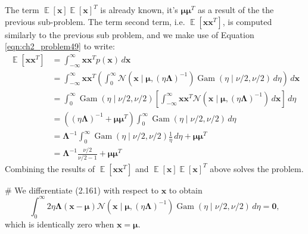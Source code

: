 \documentclass[12pt, a4paper]{article}
\newcommand{\vect}[1]{\bm{#1}}
\DeclareMathOperator{\E}{\mathbb{E}}
\begin{document}
\begin{easylist}[enumerate]
	The term $\E \left[ \vect{x}  \right] \E \left[ \vect{x}  \right]^T$ is already known, it's $\vect{\mu} \vect{\mu}^T$ as a result of the the previous sub-problem.
	The term second term, i.e. $\E \left[ \vect{x} \vect{x}^T \right]$, is computed similarly to the previous sub problem, and we make use of Equation \eqref{eqn:ch2_problem49} to write:
	\begin{align*}
	\E[ \vect{x} \vect{x}^T ] &= \int_{-\infty}^{\infty} \vect{x} \vect{x}^T  p(\vect{x} ) \, d\vect{x}  \\
	&= \int_{-\infty}^{\infty} \vect{x} \vect{x}^T 
	\left( 
	\int_{0}^{\infty}
	\mathcal{N}\left(\vect{x} \mid \vect{\mu},  (\eta \vect{\Lambda})^{-1}\right)
	\operatorname{Gam}\left(\eta \mid \nu /2, \nu / 2\right )
	\, d \eta
	\right) \, d\vect{x} \\
	&= 
	\int_{0}^{\infty}
	\operatorname{Gam}\left(\eta \mid \nu /2, \nu / 2\right )
	\left[ \int_{-\infty}^{\infty} \vect{x} \vect{x}^T
	\mathcal{N}\left(\vect{x} \mid \vect{\mu},  (\eta \vect{\Lambda})^{-1}\right)
	\, d\vect{x} \right] \, d \eta \\
	&= \left( (\eta \vect{\Lambda})^{-1} + \vect{\mu} \vect{\mu}^T \right)  \int_{0}^{\infty}
	\operatorname{Gam}\left(\eta \mid \nu /2, \nu / 2\right )
	\, d \eta \\
	&= \vect{\Lambda}^{-1} \int_{0}^{\infty}
	\operatorname{Gam}\left(\eta \mid \nu /2, \nu / 2\right ) \frac{1}{\eta}
	\, d \eta
	+ 
	\vect{\mu} \vect{\mu}^T \\
	&= \vect{\Lambda}^{-1} \frac{\nu/2}{\nu/2 - 1} + \vect{\mu} \vect{\mu}^T
	\end{align*}
	Combining the results of $\E \left[ \vect{x} \vect{x}^T \right]$ and $\E \left[ \vect{x}  \right] \E \left[ \vect{x}  \right]^T$ above solves the problem.

	
	# We differentiate (2.161) with respect to $\vect{x}$ to obtain
	\begin{equation*}
		\int_{0}^{\infty}
		 2 \eta \vect{\Lambda} (\vect{x} - \vect{\mu}) 
		\mathcal{N}\left(\vect{x} \mid \vect{\mu},  (\eta \vect{\Lambda})^{-1}\right)
		\operatorname{Gam}\left(\eta \mid \nu /2, \nu / 2\right )
		\, d \eta = \vect{0},
	\end{equation*}
	which is identically zero when $\vect{x} = \vect{\mu}$.
\end{easylist}
\end{document}
